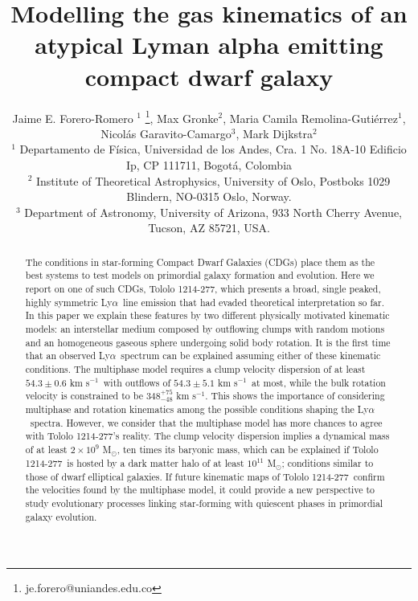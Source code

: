 \documentclass[a4,useAMS,usenatbib,usegraphicx]{mn2e}
\newcommand{\tol}{Tololo 1214-277}
\newcommand{\lya}{Ly$\alpha$}
\newcommand{\kms}{km s$^{-1}$}
\newcommand{\sigmaclump}{$54.3\pm 0.6$ km s$^{-1}$}
\newcommand{\inftyclump}{$54.3\pm 5.1$ km s$^{-1}$}
\begin{document}
\title[An atypical \lya\ dwarf galaxy]{
Modelling the gas kinematics of an atypical Lyman alpha emitting compact dwarf galaxy}
\author[J.E. Forero-Romero et al.]
{Jaime E. Forero-Romero $^{1}$ \thanks{je.forero@uniandes.edu.co},
Max Gronke$^2$, 
Maria Camila Remolina-Guti\'errez$^1$,
\newauthor
Nicol\'as Garavito-Camargo$^3$, 
Mark Dijkstra$^2$\\
$^1$ Departamento de F\'isica, Universidad de los Andes, Cra. 1
  No. 18A-10 Edificio Ip, CP 111711, Bogot\'a, Colombia \\
$^2$ Institute of Theoretical Astrophysics, University of Oslo,
Postboks 1029 Blindern, NO-0315 Oslo, Norway.\\
$^3$ Department of Astronomy, University of Arizona, 933 North Cherry
Avenue, Tucson, AZ 85721, USA. 
}


\maketitle


\begin{abstract}
  The conditions in star-forming Compact Dwarf Galaxies (CDGs) 
  place them as the best systems to test models on primordial
galaxy formation and evolution.    
Here we report on one of such CDGs, \tol, which presents
a broad, single peaked, highly symmetric \lya\ line emission that had
evaded theoretical interpretation so far.  
In this paper we explain these features by two different physically
motivated kinematic models: 
an interstellar medium composed by outflowing clumps with 
random motions and an homogeneous gaseous sphere undergoing solid body
rotation.
It is the first time that an observed \lya\ spectrum can be explained
assuming either of these kinematic conditions.
The multiphase model requires a clump velocity dispersion of
at least \sigmaclump\ with outflows of \inftyclump\ at most, while the
bulk rotation velocity is constrained to be $348^{+75}_{-48}$ \kms.
This shows the importance of considering multiphase
and rotation kinematics among the possible conditions shaping the
\lya\ spectra.
However, we consider that the multiphase model has more chances to
agree with \tol's reality. 
The clump velocity dispersion implies a dynamical mass of at least $2\times
10^{9}$ M$_{\odot}$, ten times its baryonic mass, which can be
explained if \tol\ is hosted by a dark matter halo of at least
$10^{11}$ M$_{\odot}$; conditions similar to those of dwarf elliptical
galaxies. 
If future kinematic maps of \tol\ confirm the velocities found by the
multiphase model, it could provide a new perspective to study
evolutionary processes linking star-forming with quiescent phases in
primordial galaxy evolution. 
\end{abstract}
\end{document}
